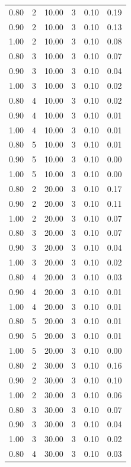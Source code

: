 \documentclass[12pt]{article}
\begin{document}
{{{{\begin{longtable}{cccccc}
0.80 &   2 & 10.00 &   3 & 0.10 & 0.19 \\ 
  0.90 &   2 & 10.00 &   3 & 0.10 & 0.13 \\ 
  1.00 &   2 & 10.00 &   3 & 0.10 & 0.08 \\ 
  0.80 &   3 & 10.00 &   3 & 0.10 & 0.07 \\ 
  0.90 &   3 & 10.00 &   3 & 0.10 & 0.04 \\ 
  1.00 &   3 & 10.00 &   3 & 0.10 & 0.02 \\ 
  0.80 &   4 & 10.00 &   3 & 0.10 & 0.02 \\ 
  0.90 &   4 & 10.00 &   3 & 0.10 & 0.01 \\ 
  1.00 &   4 & 10.00 &   3 & 0.10 & 0.01 \\ 
  0.80 &   5 & 10.00 &   3 & 0.10 & 0.01 \\ 
  0.90 &   5 & 10.00 &   3 & 0.10 & 0.00 \\ 
  1.00 &   5 & 10.00 &   3 & 0.10 & 0.00 \\ 
  0.80 &   2 & 20.00 &   3 & 0.10 & 0.17 \\ 
  0.90 &   2 & 20.00 &   3 & 0.10 & 0.11 \\ 
  1.00 &   2 & 20.00 &   3 & 0.10 & 0.07 \\ 
  0.80 &   3 & 20.00 &   3 & 0.10 & 0.07 \\ 
  0.90 &   3 & 20.00 &   3 & 0.10 & 0.04 \\ 
  1.00 &   3 & 20.00 &   3 & 0.10 & 0.02 \\ 
  0.80 &   4 & 20.00 &   3 & 0.10 & 0.03 \\ 
  0.90 &   4 & 20.00 &   3 & 0.10 & 0.01 \\ 
  1.00 &   4 & 20.00 &   3 & 0.10 & 0.01 \\ 
  0.80 &   5 & 20.00 &   3 & 0.10 & 0.01 \\ 
  0.90 &   5 & 20.00 &   3 & 0.10 & 0.01 \\ 
  1.00 &   5 & 20.00 &   3 & 0.10 & 0.00 \\ 
  0.80 &   2 & 30.00 &   3 & 0.10 & 0.16 \\ 
  0.90 &   2 & 30.00 &   3 & 0.10 & 0.10 \\ 
  1.00 &   2 & 30.00 &   3 & 0.10 & 0.06 \\ 
  0.80 &   3 & 30.00 &   3 & 0.10 & 0.07 \\ 
  0.90 &   3 & 30.00 &   3 & 0.10 & 0.04 \\ 
  1.00 &   3 & 30.00 &   3 & 0.10 & 0.02 \\ 
  0.80 &   4 & 30.00 &   3 & 0.10 & 0.03 \\ 

\end{longtable}}}}}
\end{document}
